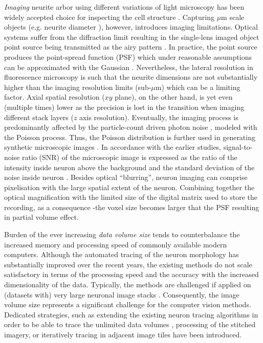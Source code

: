 \textit{Imaging} neurite arbor using different variations of light microscopy has been widely accepted choice for inspecting the cell structure \cite{meijering2010neuron,donohue2011automated}. Capturing $\mu$m scale objects (e.g. neurite diameter \cite{ascolitrees}), however, introduces imaging limitations. Optical systems suffer from the diffraction limit resulting in the single-lens imaged object point source being transmitted as the airy pattern \cite{cox2012optical}. In practice, the point source produces the point-spread function (PSF) which under reasonable assumptions can be approximated with the Gaussian \cite{zhang2007gaussian}. Nevertheless, the lateral resolution in fluorescence microscopy is such that the neurite dimensions are not substantially higher than the imaging resolution limits (sub-$\mu$m) which can be a limiting factor. Axial spatial resolution ($xy$ plane), on the other hand, is yet even (multiple times) lower as the precision is lost in the transition when imaging different stack layers ($z$ axis resolution). Eventually, the imaging process is predominantly affected by the particle-count driven photon noise \cite{van1998digital}, modeled with the Poisson process. Thus, the Poisson distribution is further used in generating synthetic microscopic images \cite{smal2010quantitative}. In accordance with the earlier studies, signal-to-noise ratio (SNR) of the microscopic image is expressed as the ratio of the intensity inside neuron above the background and the standard deviation of the noise inside neuron \cite{cheezum2001quantitative,smal2010quantitative}. Besides optical ``blurring'', neuron imaging can comprise pixelisation with the large spatial extent of the neuron. Combining together the optical magnification with the limited size of the digital matrix used to store the recording, as a consequence -the voxel size becomes larger that the PSF resulting in partial volume effect.%

Burden of the ever increasing \textit{data volume size} tends to counterbalance the increased memory and processing speed of commonly available modern computers. Although the automated tracing of the neuron morphology has substantially improved over the recent years, the existing methods do not scale satisfactory in terms of the processing speed and the accuracy with the increased dimensionality of the data. Typically, the methods are challenged if applied on (datasets with) very large neuronal image stacks \cite{peng2017automatic}. Consequently, the image volume size represents a significant challenge for the computer vision methods. Dedicated strategies, such as extending the existing neuron tracing algorithms in order to be able to trace the unlimited data volumes \cite{peng2017automatic}, processing of the stitched imagery, or iteratively tracing in adjacent image tiles \cite{zhou2015neuron} have been introduced.%


